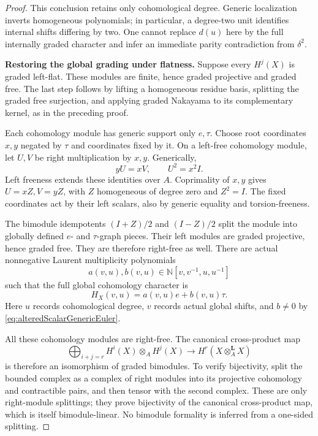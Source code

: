 \begin{proof}
This conclusion retains only cohomological degree.
Generic localization inverts homogeneous polynomials;
in particular, a degree-two unit identifies internal
shifts differing by two. One cannot replace \(d(u)\)
here by the full internally graded character and infer
an immediate parity contradiction from \(\delta^2\).

\par\smallskip\noindent\textbf{Restoring the global grading under flatness.}\quad
Suppose every \(H^j(X)\) is graded left-flat.
These modules are finite, hence graded projective and
graded free. The last step follows by lifting a homogeneous
residue basis, splitting the graded free surjection,
and applying graded Nakayama to its complementary kernel,
as in the preceding proof.

Each cohomology module has generic support only \(e,\tau\).
Choose root coordinates \(x,y\) negated by \(\tau\)
and coordinates fixed by it. On a left-free cohomology
module, let \(U,V\) be right multiplication by \(x,y\).
Generically,
\[
                         yU=xV,\qquad U^2=x^2I.
\]
Left freeness extends these identities over \(A\).
Coprimality of \(x,y\) gives \(U=xZ,V=yZ\), with
\(Z\) homogeneous of degree zero and \(Z^2=I\).
The fixed coordinates act by their left scalars, also
by generic equality and torsion-freeness.

The bimodule idempotents \((I+Z)/2\) and \((I-Z)/2\)
split the module into globally defined \(e\)- and
\(\tau\)-graph pieces. Their left modules are graded
projective, hence graded free. They are therefore
right-free as well. There are actual nonnegative
Laurent multiplicity polynomials
\[
 a(v,u),b(v,u)\in\mathbb N[v,v^{-1},u,u^{-1}]
\]
such that the full global cohomology character is
\begin{equation}\label{eq:alteredScalarGlobalGraphs}
                       H_X(v,u)=a(v,u)e+b(v,u)\tau.
\end{equation}
Here \(u\) records cohomological degree, \(v\) records
actual global shifts, and \(b\ne0\) by
\eqref{eq:alteredScalarGenericEuler}.

All these cohomology modules are right-free. The canonical
cross-product map
\begin{equation}\label{eq:alteredScalarKunneth}
 \bigoplus_{i+j=r}H^i(X)\otimes_AH^j(X)
       \longrightarrow H^r(X\otimes_A^{\mathbf L}X)
\end{equation}
is therefore an isomorphism of graded bimodules. To verify
bijectivity, split the bounded complex as a complex of
right modules into its projective cohomology and
contractible pairs, and then tensor with the second
complex. These are only right-module splittings; they
prove bijectivity of the canonical cross-product map,
which is itself bimodule-linear. No bimodule formality
is inferred from a one-sided splitting.


\end{proof}
